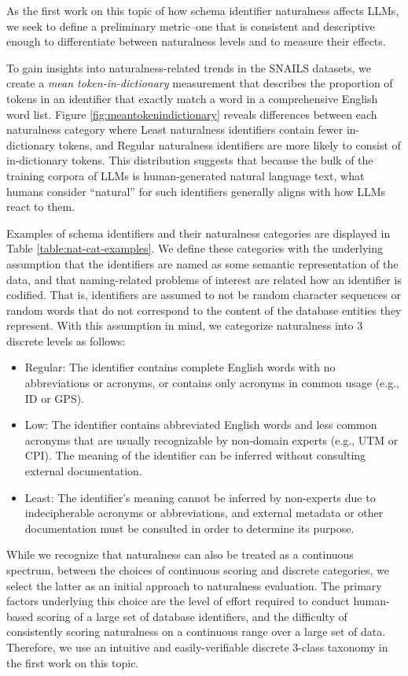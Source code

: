 As the first work on this topic of how schema identifier naturalness affects LLMs, we seek to define a preliminary metric--one that is consistent and descriptive enough to differentiate between naturalness levels and to measure their effects.

To gain insights into naturalness-related trends in the SNAILS datasets, we create a \emph{mean token-in-dictionary} measurement that describes the proportion of tokens in an identifier that exactly match a word in a comprehensive English word list.
Figure \ref{fig:meantokenindictionary} reveals differences between each naturalness category where Least naturalness identifiers contain fewer in-dictionary tokens, and Regular naturalness identifiers are more likely to consist of in-dictionary tokens.
This distribution suggests that because the bulk of the training corpora of LLMs is human-generated natural language text, what humans consider ``natural'' for such identifiers generally aligns with how LLMs react to them.

Examples of schema identifiers and their naturalness categories are displayed in Table \ref{table:nat-cat-examples}.
We define these categories with the underlying assumption that the identifiers are named as some semantic representation of the data, and that naming-related problems of interest are related how an identifier is codified.
That is, identifiers are assumed to not be random character sequences or random words that do not correspond to the content of the database entities they represent.
With this assumption in mind, we categorize naturalness into 3 discrete levels as follows: 
\begin{itemize}
  \item Regular: The identifier contains complete English words with no abbreviations or acronyms, or contains only acronyms in common usage (e.g., ID or GPS).
  \item Low: The identifier contains abbreviated English words and less common acronyms that are usually recognizable by non-domain experts (e.g., UTM or  CPI). The meaning of the identifier can be inferred without consulting external documentation.
  \item Least: The identifier's meaning cannot be inferred by non-experts due to indecipherable acronyms or abbreviations, and external metadata or other documentation must be consulted in order to determine its purpose.
\end{itemize}

While we recognize that naturalness can also be treated as a continuous spectrum, between the choices of continuous scoring and discrete categories, we select the latter as an initial approach to naturalness evaluation.
The primary factors underlying this choice are the level of effort required to conduct human-based scoring of a large set of database identifiers, and the difficulty of consistently scoring naturalness on a continuous range over a large set of data.
Therefore, we use an intuitive and easily-verifiable discrete 3-class taxonomy in the first work on this topic.


